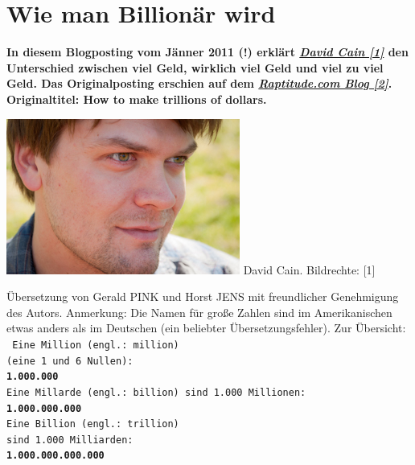 \section*{Wie man Billion\"ar wird}
\hypertarget{trillions}{}
\label{trillions}

\textbf{In diesem Blogposting vom Jänner 2011 (!) erklärt \href{http://www.raptitude.com/contact/}{\textit{David Cain [1]}} den Unterschied zwischen viel Geld, wirklich viel Geld und viel zu viel Geld. Das Originalposting erschien auf dem \href{http://www.raptitude.com/2011/01/how-to-make-trillions-of-dollars}{\textit{Raptitude.com Blog [2]}}. Originaltitel: How to make trillions of dollars.}

\begin{center}
\includegraphics[width=0.9\linewidth]{trillions/trillions-davidcain.jpg} 
\footnotesize{David Cain. Bildrechte: [1]}
\end{center}

Übersetzung von Gerald PINK und Horst JENS mit freundlicher Genehmigung des Autors. Anmerkung: Die Namen für große Zahlen sind im Amerikanischen etwas anders als im Deutschen (ein beliebter Übersetzungsfehler). Zur Übersicht: \\
\texttt{
Eine Million  (engl.: million)\\
(eine 1 und 6 Nullen):\\
\textbf{1.000.000}\\
Eine Millarde (engl.: billion)
sind 1.000 Millionen:\\
\textbf{1.000.000.000}\\
Eine Billion  (engl.: trillion) \\
sind 1.000 Milliarden: \\
\textbf{1.000.000.000.000}
}

